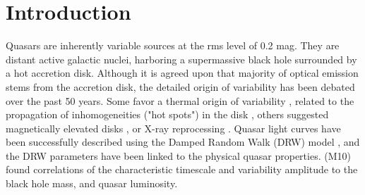 \documentclass[twocolumn]{aastex62}
\begin{document}

\author[0000-0002-9589-1306]{Krzysztof L. Suberlak}


\author{\v{Z}eljko Ivezi\'c}



\author{Chelsea MacLeod}




\begin{abstract}

\end{abstract}



\section{Introduction}

Quasars are inherently variable sources at the rms level of 0.2 mag. They are distant active galactic nuclei, harboring a supermassive black hole surrounded by a hot accretion disk. Although it is agreed upon that majority of optical emission stems from the accretion disk, the detailed origin of variability has been debated over the past 50 years. Some favor a thermal origin of variability \citep{kelly2013}, related to the propagation of inhomogeneities ("hot spots") in the disk \citep{dexter2011}, others suggested magnetically elevated disks \citep{dexter2019}, or X-ray reprocessing  \citep{kubota2018}.   Quasar light curves have been successfully described using the Damped Random Walk (DRW) model \citep{kelly2009, macleod2010, kozlowski2010, zu2011, kasliwal2015a}, and the DRW parameters have been linked to the physical quasar properties. \citet{macleod2010} (M10) found correlations of the characteristic timescale and variability amplitude  to the black hole mass, and quasar luminosity.
\end{document}
